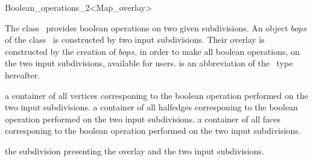
\ccRefPageBegin



\begin{ccRefClass}{Boolean_operations_2<Map_overlay>}
\label{OVL_sec:bops}
    
\ccDefinition
The class \ccClassTemplateName\ provides boolean operations 
on two given subdivisions. 
An object $bops$ of the class \ccClassTemplateName\ is constructed by two input subdivisions. 
Their overlay is constructed by the creation of $bops$, in order to make all boolean 
operations, on the two input subdivisions, available for users.
 is an abbreviation of the \ccRefName\ type hereafter.


\ccTypes

  \ccGlue
  {a container of all vertices corresponing to the boolean operation performed on the two input subdivisions.}
  \ccGlue
  {a container of all halfedges corresponing to the boolean operation performed on the two input subdivisions.}
  \ccGlue
  {a container of all faces corresponing to the boolean operation performed on the two input subdivisions.}

  {the subdivision presenting the overlay and the two input subdivisions.}
  

\end{ccRefClass}
